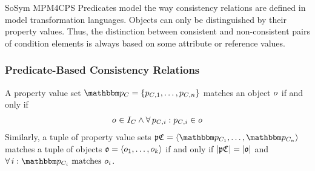 \begin{copiedFrom}{SoSym MPM4CPS}
Predicates model the way consistency relations are defined in %
model transformation languages. Objects can only be distinguished by their property values. Thus, the distinction between consistent and non-consistent pairs of condition elements is always based on some attribute or reference values.

\subsubsection{Predicate-Based Consistency Relations}
\label{sec:predicatebasedconsistencyrelations}

\begin{definition}
A property value set $\propertyvalueset{p}{\class{C}{}} = \{p_{\class{C}{}, 1}, \dots, p_{\class{C}{}, n}\}$ matches an object $o_{}$ if and only if
\begin{align*}
    \formulaskip &
    \object{o}{} \in I_{\class{C}{}} \wedge \forall p_{\class{C}{}, i} : p_{\class{C}{}, i} \in \object{o}{}
\end{align*}
%
Similarly, a tuple of property value sets $\propertyvaluesettuple{p}{\classtuple{C}{}} = \tupled{\propertyvalueset{p}{\class{C}{1}}, \dots, \propertyvalueset{p}{\class{C}{n}}}$ matches a tuple of objects $\mathfrak{o}{} = \langle o_{1}, \dots, o_{k} \rangle$ if and only if $|\mathfrak{p}{\mathfrak{C}_{}}| = |\mathfrak{o}{}|$ and $\forall i : \propertyvalueset{p}{\class{C}{i}}\ \text{matches}\ \object{o}{i}$.
\end{definition}


\end{copiedFrom}
